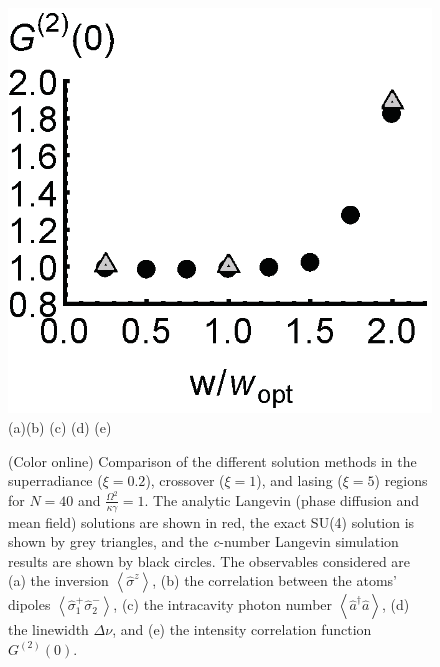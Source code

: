 \documentclass[aps,
twocolumn,
showpacs,
superscriptaddress,groupedaddress]{revtex4}
\begin{document}
\begin{figure}
\begin{center}
	\hspace{-5.0mm} \includegraphics[scale =0.38] {N40LaserG2.eps}\\ \vspace{1mm}
	\hspace{5mm}(a)\hspace{30mm}(b) \hspace{30mm}(c) \hspace{30mm}(d) \hspace{30mm}(e)
\end{center}
		\vspace{-5mm}
\caption{(Color online) Comparison of the different solution methods in
the superradiance ($\xi=0.2$), crossover ($\xi=1$), and lasing ($\xi=5$)
regions for $N=40$ and $\frac{\Omega^2}{\kappa \gamma}=1$.  The analytic
Langevin (phase diffusion and mean field) solutions are shown in red, 
the exact SU(4) solution is shown by grey triangles, and the {\it
c}-number Langevin simulation results are shown by black circles. The
observables considered are (a) the inversion
$\left<\hat{\sigma}^{z}\right>$, (b) the correlation between the atoms'
dipoles $\left<\hat{\sigma}_{1}^{+} \hat{\sigma}_{2}^{-}\right>$, (c)
the intracavity photon number  $\left<\hat{a}^{\dagger}\hat{a}\right>$,
(d) the linewidth $\Delta \nu$, and (e) the intensity correlation
function $G^{(2)}(0)$.}
\label{N40Comparison}
\end{figure}
\end{document}
